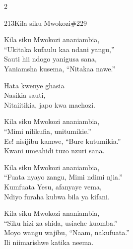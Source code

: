\documentclass{article}
\begin{document}
\begin{multicols}{2}
\begin{hymn}{213}{Kila siku Mwokozi}{\#229}
\begin{stanza}
Kila siku Mwokozi ananiambia,\\
``Ukitaka kufaulu kaa ndani yangu,''\\
Sauti hii ndogo yanigusa sana,\\
Yaniamsha kusema, ``Nitakaa nawe.''
\end{stanza}
\begin{chorus}
Hata kwenye ghasia\\
Nasikia sauti,\\
Nitaiitikia, japo kwa machozi.
\end{chorus}
\begin{stanza}
Kila siku Mwokozi ananiambia,\\
``Mimi nilikufia, unitumikie.''\\
Ee! nisijibu kamwe, ``Bure kutumikia.''\\
Kwani umeahidi tuzo nzuri sana.
\end{stanza}
\begin{stanza}
Kila siku Mwokozi ananiambia,\\
``Fuata nyayo zangu, Mimi ndimi njia.''\\
Kumfuata Yesu, afanyaye vema,\\
Ndiyo furaha kubwa bila ya kifani.
\end{stanza}
\begin{stanza}
Kila siku Mwokozi ananiambia,\\
``Siku hizi za shida, usiache kuomba.''\\
Moyo wangu wajibu, ``Naam, nakufuata.''\\
Ili niimarishwe katika neema.
\end{stanza}
\end{hymn}


\end{multicols}
\end{document}
